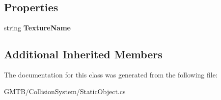 \subsection*{Properties}
\begin{DoxyCompactItemize}
\item 
\mbox{\label{class_g_m_t_b_1_1_collision_system_1_1_static_object_ac0b31e863363870656d406561054298f}} 
string {\bfseries Texture\+Name}
\end{DoxyCompactItemize}
\subsection*{Additional Inherited Members}


The documentation for this class was generated from the following file\+:\begin{DoxyCompactItemize}
\item 
G\+M\+T\+B/\+Collision\+System/Static\+Object.\+cs\end{DoxyCompactItemize}
